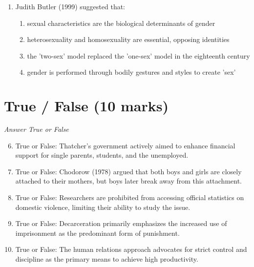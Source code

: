 \documentclass[12pt]{article}
\begin{document}
\begin{enumerate}[label=\arabic*.]
\begin{enumerate}[label=(\alph*)]
    \item a universalist system of welfare for all, regardless of income
    \item decommodifying social welfare through state provision
\end{enumerate}
\item Judith Butler (1999) suggested that:
\begin{enumerate}[label=(\alph*)]
    \item sexual characteristics are the biological determinants of gender
    \item heterosexuality and homosexuality are essential, opposing identities
    \item the 'two-sex' model replaced the 'one-sex' model in the eighteenth century
    \item gender is performed through bodily gestures and styles to create 'sex'
\end{enumerate}
\end{enumerate}

\section*{True / False (10 marks)}
\textit{Answer True or False}
\begin{enumerate}[label=\arabic*.]
\setcounter{enumi}{5}
\item True or False: Thatcher's government actively aimed to enhance financial support for single parents, students, and the unemployed.
\item True or False: Chodorow (1978) argued that both boys and girls are closely attached to their mothers, but boys later break away from this attachment.
\item True or False: Researchers are prohibited from accessing official statistics on domestic violence, limiting their ability to study the issue.
\item True or False: Decarceration primarily emphasizes the increased use of imprisonment as the predominant form of punishment.
\item True or False: The human relations approach advocates for strict control and discipline as the primary means to achieve high productivity.
\end{enumerate}
\end{document}
